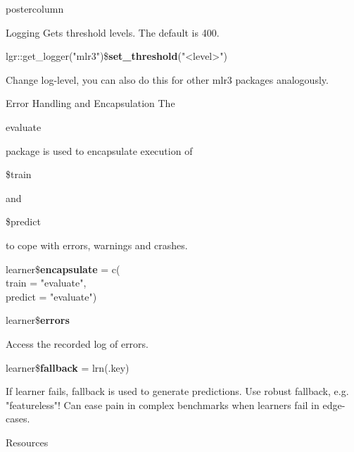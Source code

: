 \documentclass{beamer}
\newcommand{\codeinline}[1]{\begin{codeboxinline}#1\end{codeboxinline}}
\begin{document}
\begin{withoutheader}
\begin{frame}[fragile]{}
\begin{columns}
\begin{column}{.245\textwidth}
\begin{beamercolorbox}[center]{postercolumn}
\begin{minipage}{.98\textwidth}
{\begin{myblock}{Logging}
							Gets threshold levels. The default is 400. 
							\\
							\begin{codeboxmultiline}[width=25cm]
								\footnotesize{
								lgr::get\_logger("mlr3")\$\textbf{set\_threshold}("<level>")
							}
							\end{codeboxmultiline}
							Change log-level, you can also do this for other mlr3 packages analogously.
						\end{myblock}
						\begin{myblock}{Error Handling and Encapsulation}
							The \codeinline{evaluate} package is used to encapsulate execution of \codeinline{\$train} and \codeinline{\$predict} to cope with errors, warnings and crashes.
							\\
							\begin{codeboxmultiline}[width=16cm]
								learner\$\textbf{encapsulate} = c(\\
								\hspace*{1ex} train = "evaluate", \\
								\hspace*{1ex} predict = "evaluate")
							\end{codeboxmultiline}
							\begin{codebox}
								learner\$\textbf{errors}
							\end{codebox}
							Access the recorded log of errors.
							\vspace{1em}
							\\
							\begin{codebox}
								learner\$\textbf{fallback} = lrn(.key)
							\end{codebox}
							If learner fails, fallback is used to generate predictions. 
                            Use robust fallback, e.g. "featureless"! Can ease pain in complex benchmarks when learners fail in edge-cases.
						\end{myblock}
						\begin{myblock}{Resources}

\end{myblock}}
\end{minipage}
\end{beamercolorbox}
\end{column}
\end{columns}
\end{frame}
\end{withoutheader}
\end{document}
